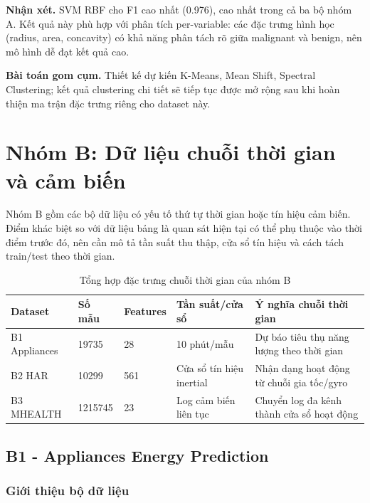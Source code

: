\textbf{Nhận xét.} SVM RBF cho F1 cao nhất (0.976), cao nhất trong cả ba bộ nhóm A. Kết quả này phù hợp với phân tích per-variable: các đặc trưng hình học (radius, area, concavity) có khả năng phân tách rõ giữa malignant và benign, nên mô hình dễ đạt kết quả cao.

\textbf{Bài toán gom cụm.} Thiết kế dự kiến K-Means, Mean Shift, Spectral Clustering; kết quả clustering chi tiết sẽ tiếp tục được mở rộng sau khi hoàn thiện ma trận đặc trưng riêng cho dataset này.

\section{Nhóm B: Dữ liệu chuỗi thời gian và cảm biến}

Nhóm B gồm các bộ dữ liệu có yếu tố thứ tự thời gian hoặc tín hiệu cảm biến. Điểm khác biệt so với dữ liệu bảng là quan sát hiện tại có thể phụ thuộc vào thời điểm trước đó, nên cần mô tả tần suất thu thập, cửa sổ tín hiệu và cách tách train/test theo thời gian.

\begin{table}[H]
\centering
\caption{Tổng hợp đặc trưng chuỗi thời gian của nhóm B}
\label{tab:group_b_timeseries_summary}
\small
\begin{tabular}{p{}p{}p{}p{}p{}}
\toprule
Dataset & Số mẫu & Features & Tần suất/cửa sổ & Ý nghĩa chuỗi thời gian \\
\midrule
B1 Appliances & 19735 & 28 & 10 phút/mẫu & Dự báo tiêu thụ năng lượng theo thời gian \\
B2 HAR & 10299 & 561 & Cửa sổ tín hiệu inertial & Nhận dạng hoạt động từ chuỗi gia tốc/gyro \\
B3 MHEALTH & 1215745 & 23 & Log cảm biến liên tục & Chuyển log đa kênh thành cửa sổ hoạt động \\
\bottomrule
\end{tabular}
\end{table}

\subsection{B1 - Appliances Energy Prediction}

\subsubsection{Giới thiệu bộ dữ liệu}

